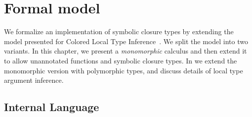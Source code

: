 %




\section{Formal model}

We formalize an implementation of symbolic closure types by extending
the model presented for Colored Local Type Inference~\cite{coloredlti01}.
We split the model into two variants.
In this chapter, we present a \emph{monomorphic} calculus
and then extend it to allow unannotated functions and symbolic closure types.
In 
we extend the monomorphic version with polymorphic types, and discuss
details of local type argument inference.

\subsection{Internal Language}

